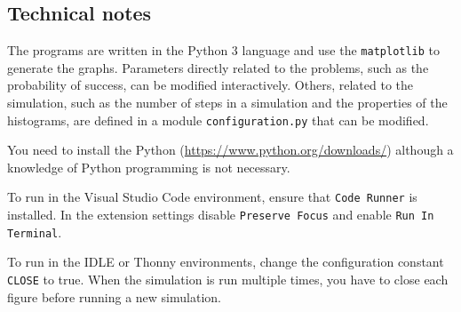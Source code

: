 \subsection*{Technical notes}

The programs are written in the Python 3 language and use the \verb+matplotlib+ to generate the graphs. Parameters directly related to the problems, such as the probability of success, can be modified interactively. Others, related to the simulation, such as the number of steps in a simulation and the properties of the histograms, are defined in a module \verb+configuration.py+ that can be modified.

You need to install the Python (\url{https://www.python.org/downloads/}) although a knowledge of Python programming is not necessary.

To run in the Visual Studio Code environment, ensure that \verb+Code Runner+ is installed. In the extension settings disable \verb+Preserve Focus+ and enable \verb+Run In Terminal+.

To run in the IDLE or Thonny environments, change the configuration constant \verb+CLOSE+ to true. When the simulation is run multiple times, you have to close each figure before running a new simulation.
